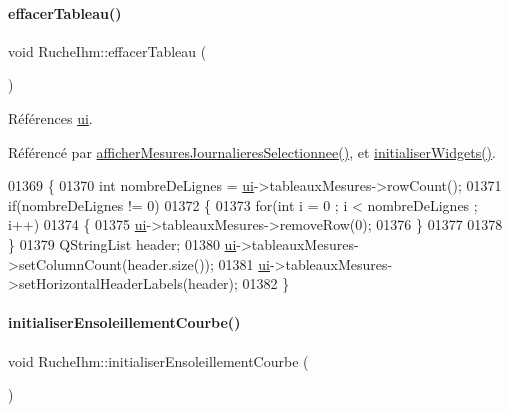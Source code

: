 \paragraph{\texorpdfstring{effacer\+Tableau()}{effacerTableau()}}
{\footnotesize\ttfamily void Ruche\+Ihm\+::effacer\+Tableau (\begin{DoxyParamCaption}{ }\end{DoxyParamCaption})\hspace{0.3cm}{\ttfamily [private]}}



Références \hyperlink{class_ruche_ihm_a64786058bd7f88ca2f1e9743bb27c25b}{ui}.



Référencé par \hyperlink{class_ruche_ihm_a7f66af552d9e7ba0d00437ff3b330706}{afficher\+Mesures\+Journalieres\+Selectionnee()}, et \hyperlink{class_ruche_ihm_a98c493fcd2ef145a3d51ff84bbf8748e}{initialiser\+Widgets()}.


\begin{DoxyCode}
01369 \{
01370     \textcolor{keywordtype}{int} nombreDeLignes = \hyperlink{class_ruche_ihm_a64786058bd7f88ca2f1e9743bb27c25b}{ui}->tableauxMesures->rowCount();
01371     \textcolor{keywordflow}{if}(nombreDeLignes != 0)
01372     \{
01373         \textcolor{keywordflow}{for}(\textcolor{keywordtype}{int} i = 0 ; i < nombreDeLignes ; i++)
01374         \{
01375             \hyperlink{class_ruche_ihm_a64786058bd7f88ca2f1e9743bb27c25b}{ui}->tableauxMesures->removeRow(0);
01376         \}
01377 
01378     \}
01379     QStringList header;
01380     \hyperlink{class_ruche_ihm_a64786058bd7f88ca2f1e9743bb27c25b}{ui}->tableauxMesures->setColumnCount(header.size());
01381     \hyperlink{class_ruche_ihm_a64786058bd7f88ca2f1e9743bb27c25b}{ui}->tableauxMesures->setHorizontalHeaderLabels(header);
01382 \}
\end{DoxyCode}
\mbox{\label{class_ruche_ihm_a18936cec4b04cee55b582847a5f9c0d7}} 
\paragraph{\texorpdfstring{initialiser\+Ensoleillement\+Courbe()}{initialiserEnsoleillementCourbe()}}
{\footnotesize\ttfamily void Ruche\+Ihm\+::initialiser\+Ensoleillement\+Courbe (\begin{DoxyParamCaption}{ }\end{DoxyParamCaption})\hspace{0.3cm}{\ttfamily [private]}}



